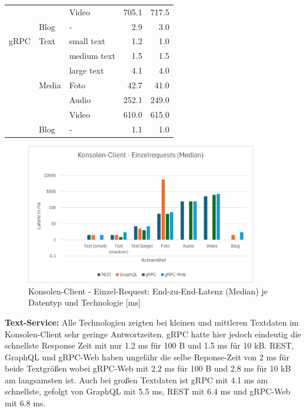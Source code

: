 \begin{table}[h]
\begin{tabular}{|l|l|l|r|r|}
		&       & Video       & 705.1 & 717.5 \\
		& Blog  & -           & 2.9 & 3.0 \\
		\hline
		gRPC & Text  & small text  & 1.2 & 1.0 \\
		&       & medium text & 1.5 & 1.5 \\
		&       & large text  & 4.1 & 4.0 \\
		& Media & Foto        & 42.7 & 41.0 \\
		&       & Audio       & 252.1 & 249.0 \\
		&       & Video       & 610.0 & 615.0 \\
		& Blog  & -           & 1.1 & 1.0 \\
		\hline
	\end{tabular}
\end{table}

\clearpage

\begin{figure}[htbp]
	\centering
	\includegraphics[width=0.9\textwidth]{images/Konsolenclient.png}
	\caption{Konsolen-Client - Einzel-Request: End-zu-End-Latenz (Median) je Datentyp und Technologie [ms]}
	\label{fig:console-client-1req}
\end{figure}

\textbf{Text-Service:}  
Alle Technologien zeigten bei kleinen und mittleren Textdaten im Konsolen-Client sehr geringe Antwortzeiten. gRPC hatte hier jedoch eindeutig die schnellste Response Zeit mit nur 1.2 ms für 100 B und 1.5 ms für 10 kB. REST, GraphQL und gRPC-Web haben ungefähr die selbe Reponse-Zeit von 2 ms für beide Textgrößen wobei gRPC-Web mit 2.2 ms für 100 B und 2.8 ms für 10 kB am langsamsten ist.
Auch bei großen Textdaten ist gRPC mit 4.1 ms am schnellste, gefolgt von GraphQL mit 5.5 ms, REST mit 6.4 ms und gRPC-Web mit 6.8 ms.


